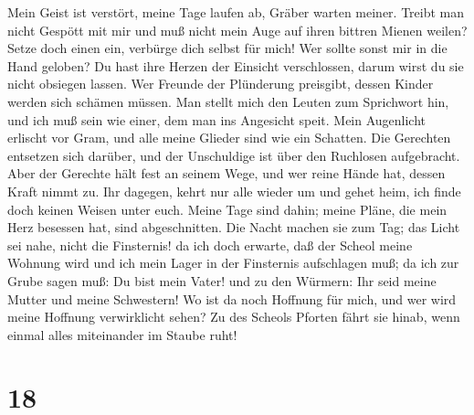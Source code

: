  Mein Geist ist verstört, meine Tage laufen ab, Gräber
warten meiner.  Treibt man nicht Gespött mit mir und muß
nicht mein Auge auf ihren bittren Mienen weilen?  Setze
doch einen ein, verbürge dich selbst für mich! Wer sollte sonst mir in
die Hand geloben?  Du hast ihre Herzen der Einsicht
verschlossen, darum wirst du sie nicht obsiegen lassen. 
Wer Freunde der Plünderung preisgibt, dessen Kinder werden sich schämen
müssen.  Man stellt mich den Leuten zum Sprichwort hin,
und ich muß sein wie einer, dem man ins Angesicht speit. 
Mein Augenlicht erlischt vor Gram, und alle meine Glieder sind wie ein
Schatten.  Die Gerechten entsetzen sich darüber, und der
Unschuldige ist über den Ruchlosen aufgebracht.  Aber der
Gerechte hält fest an seinem Wege, und wer reine Hände hat, dessen Kraft
nimmt zu.  Ihr dagegen, kehrt nur alle wieder um und
gehet heim, ich finde doch keinen Weisen unter euch. 
Meine Tage sind dahin; meine Pläne, die mein Herz besessen hat, sind
abgeschnitten.  Die Nacht machen sie zum Tag; das Licht
sei nahe, nicht die Finsternis!  da ich doch erwarte, daß
der Scheol meine Wohnung wird und ich mein Lager in der Finsternis
aufschlagen muß;  da ich zur Grube sagen muß: Du bist
mein Vater! und zu den Würmern: Ihr seid meine Mutter und meine
Schwestern!  Wo ist da noch Hoffnung für mich, und wer
wird meine Hoffnung verwirklicht sehen?  Zu des Scheols
Pforten fährt sie hinab, wenn einmal alles miteinander im Staube ruht!

\hypertarget{section-17}{%
\section{18}\label{section-17}}


